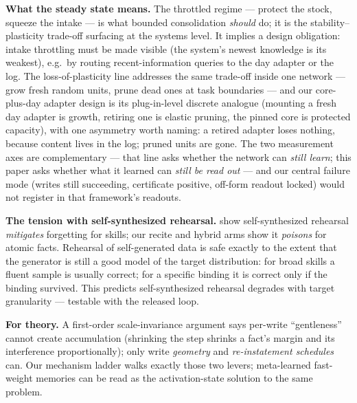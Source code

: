 \documentclass[11pt]{article}
\begin{document}
\textbf{What the steady state means.} The throttled regime --- protect the stock, squeeze the
intake --- is what bounded consolidation \emph{should} do; it is the stability--plasticity
trade-off surfacing at the systems level. It implies a design obligation: intake throttling must
be made visible (the system's newest knowledge is its weakest), e.g.\ by routing
recent-information queries to the day adapter or the log. The loss-of-plasticity line
\citep{kong2026plasticity} addresses the same trade-off inside one network --- grow fresh
random units, prune dead ones at task boundaries --- and our core-plus-day adapter design
is its plug-in-level discrete analogue (mounting a fresh day adapter is growth, retiring
one is elastic pruning, the pinned core is protected capacity), with one asymmetry worth
naming: a retired adapter loses
nothing, because content lives in the log; pruned units are gone. The two measurement axes
are complementary --- that line asks whether the network can \emph{still learn}; this paper
asks whether what it learned can \emph{still be read out} --- and our central failure mode
(writes still succeeding, certificate positive, off-form readout locked) would not register
in that framework's readouts.

\textbf{The tension with self-synthesized rehearsal.} \citet{huang2024ssr} show self-synthesized
rehearsal \emph{mitigates} forgetting for skills; our recite and hybrid arms show it
\emph{poisons} for atomic facts. Rehearsal of self-generated data is safe exactly to the extent
that the generator is still a good model of the target distribution: for broad skills a fluent
sample is usually correct; for a specific binding it is correct only if the binding survived.
This predicts self-synthesized rehearsal degrades with target granularity --- testable with the
released loop.

\textbf{For theory.} A first-order scale-invariance argument says per-write ``gentleness''
cannot create accumulation (shrinking the step shrinks a fact's margin and its interference
proportionally); only write \emph{geometry} and \emph{re-instatement schedules} can. Our
mechanism ladder walks exactly those two levers; meta-learned fast-weight memories
\citep{ahn2025} can be read as the activation-state solution to the same problem.
\end{document}
